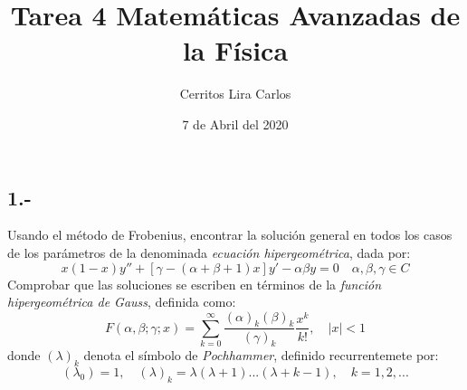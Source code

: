 \documentclass{article}
\title{Tarea 4 Matemáticas Avanzadas de la Física}
\author{Cerritos Lira Carlos}
\date{7 de Abril del 2020}
\begin{document}
\maketitle
\subsection*{1.-}
Usando el método de Frobenius, encontrar la solución general en todos los casos de los 
parámetros de la denominada \textit{ecuación hipergeométrica}, dada por:
\[ x(1-x)y'' + [\gamma - (\alpha + \beta + 1)x]y' - \alpha \beta y = 0 \quad \alpha,\beta,\gamma \in C \]
Comprobar que las soluciones se escriben en términos de la \textit{función hipergeométrica de Gauss}, definida como:
\[ F(\alpha, \beta; \gamma; x) = \sum_{k=0}^\infty \frac{(\alpha)_k(\beta)_k}{(\gamma)_k} \frac{x^k}{k!}, \quad |x| < 1 \]
donde $(\lambda)_k$ denota el símbolo de \textit{Pochhammer}, definido recurrentemete por:
\[ (\lambda_0) = 1, \quad (\lambda)_k = \lambda(\lambda+1)...(\lambda+k-1), \quad k=1,2,... \]
\end{document}
